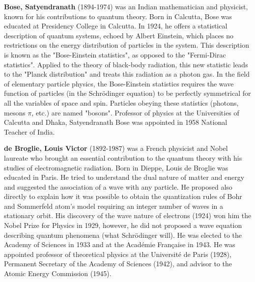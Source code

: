 \textbf{Bose, Satyendranath} (1894-1974) was an Indian mathematician and physicist, known for his contributions to quantum theory. Born in Calcutta, Bose was educated at Presidency College in Calcutta. In 1924, he offers a statistical description of quantum systems, echoed by Albert Einstein, which places no restrictions on the energy distribution of particles in the system. This description is known as the "Bose-Einstein statistics", as opposed to the "Fermi-Dirac statistics". Applied to the theory of black-body radiation, this new statistic leads to the "Planck distribution" and treats this radiation as a photon gas. In the field of elementary particle physics, the Bose-Einstein statistics requires the wave function of particles (in the Schrödinger equation) to be perfectly symmetrical for all the variables of space and spin. Particles obeying these statistics (photons, mesons $\pi$, etc.) are named "bosons". Professor of physics at the Universities of Calcutta and Dhaka, Satyendranath Bose was appointed in 1958 National Teacher of India.

\textbf{de Broglie, Louis Victor} (1892-1987) was a  French physicist and Nobel laureate who brought an essential contribution to the quantum theory with his studies of electromagnetic radiation. Born in Dieppe, Louis de Broglie was educated in Paris. He tried to understand the dual nature of matter and energy and suggested the association of a wave with any particle. He proposed also directly to explain how it was possible to obtain the quantization rules of Bohr and Sommerfeld atom's model requiring an integer number of waves in a stationary orbit. His discovery of the wave nature of electrons (1924) won him the Nobel Prize for Physics in 1929, however, he did not proposed a wave equation describing quantum phenomena (what Schrödinger will). He was elected to the Academy of Sciences in 1933 and at the Académie Française in 1943. He was appointed professor of theoretical physics at the Université de Paris (1928), Permanent Secretary of the Academy of Sciences (1942), and advisor to the Atomic Energy Commission (1945).

